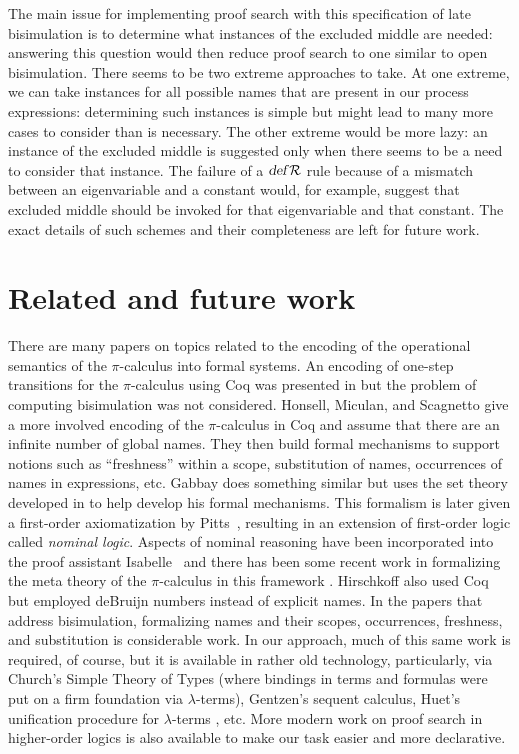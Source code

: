 \documentclass{acmtrans2m}
\newcommand{\defR}{\hbox{\sl def\/{}}{\cal R}}
\begin{document}
The main issue for implementing proof search with this specification
of late bisimulation is to determine what instances of the excluded
middle are needed: answering this question would then reduce proof
search to one similar to open bisimulation.  There seems to be two
extreme approaches to take. At one extreme, we can take instances for
all possible names that are present in our process expressions:
determining such instances is simple but might lead to many more cases
to consider than is necessary.  The other extreme would be more lazy:
an instance of the excluded middle is suggested only when there seems
to be a need to consider that instance.  The failure of a $\defR$ rule
because of a mismatch between an eigenvariable and
a constant would, for example, suggest that excluded middle should be
invoked for that eigenvariable and that constant.  The exact details
of such schemes and their completeness are left for future work.


\section{Related and future work}
\label{sec:related}

There are many papers on topics related to the encoding of the
operational semantics of the $\pi$-calculus into formal systems.  An
encoding of one-step transitions for the $\pi$-calculus using Coq was
presented in \cite{despeyroux00ifiptcs} but the problem of computing
bisimulation was not considered.  Honsell, Miculan, and Scagnetto
\cite{honsell01tcs} give a more involved encoding of the
$\pi$-calculus in Coq and assume that there are an infinite number of
global names.  They then build formal mechanisms to support notions
such as ``freshness'' within a scope, substitution of names,
occurrences of names in expressions, etc.  Gabbay
\cite{gabbay03automath} does something similar but uses the
set theory developed in \cite{gabbay01fac} to help develop his formal
mechanisms.  This formalism is later given a first-order axiomatization by
Pitts~\cite{pitts03ic}, resulting in an extension of first-order logic called 
{\em nominal logic}.  Aspects of nominal reasoning have been incorporated
into the proof assistant Isabelle~\cite{urban05cade} and there has been
some recent work in formalizing the meta theory of the $\pi$-calculus
in this framework \cite{bengtson07fossacs}.
Hirschkoff \cite{hirschkoff97tphol} also used Coq but
employed deBruijn numbers \cite{debruijn72} instead of explicit names.
In the papers that address bisimulation, formalizing names and their
scopes, occurrences, freshness, and substitution is considerable work.
In our approach, much of this same work is required, of course, but it
is available in rather old technology, particularly, via Church's
Simple Theory of Types (where bindings in terms and formulas were put
on a firm foundation via $\lambda$-terms), Gentzen's sequent calculus,
Huet's unification procedure for $\lambda$-terms \cite{huet75tcs},
etc.  More modern work on proof search in higher-order logics is also
available to make our task easier and more declarative.
\end{document}
